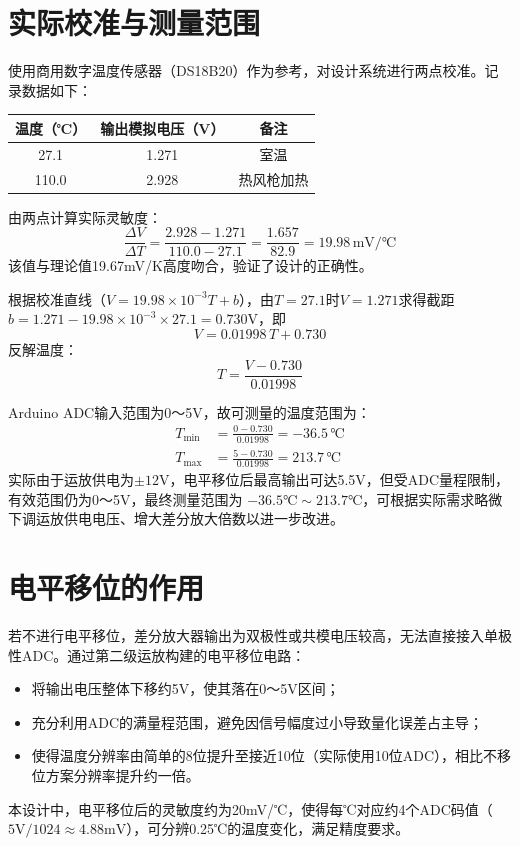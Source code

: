 \documentclass[12pt,a4paper]{article}
\begin{document}
\section{实际校准与测量范围}
使用商用数字温度传感器（DS18B20）作为参考，对设计系统进行两点校准。记录数据如下：
\begin{table}[H]
    \centering
    \begin{tabular}{c|c|c}
        \toprule
        温度（℃） & 输出模拟电压（V） & 备注 \\
        \midrule
        27.1 & 1.271 & 室温 \\
        110.0 & 2.928 & 热风枪加热 \\
        \bottomrule
    \end{tabular}
\end{table}

由两点计算实际灵敏度：
\begin{equation}
    \frac{\Delta V}{\Delta T} = \frac{2.928 - 1.271}{110.0 - 27.1} = \frac{1.657}{82.9} = 19.98\,\mathrm{mV/℃}
\end{equation}
该值与理论值19.67mV/K高度吻合，验证了设计的正确性。

根据校准直线（$V = 19.98\times 10^{-3} T + b$），由$T=27.1$时$V=1.271$求得截距$b = 1.271 - 19.98\times10^{-3}\times27.1 = 0.730\mathrm{V}$，即
\begin{equation}
    V = 0.01998\,T + 0.730
\end{equation}
反解温度：
\begin{equation}
    T = \frac{V - 0.730}{0.01998}
\end{equation}

Arduino ADC输入范围为0～5V，故可测量的温度范围为：
\begin{align}
    T_{\min} &= \frac{0 - 0.730}{0.01998} = -36.5\,℃ \\
    T_{\max} &= \frac{5 - 0.730}{0.01998} = 213.7\,℃
\end{align}
实际由于运放供电为$\pm12\mathrm{V}$，电平移位后最高输出可达5.5V，但受ADC量程限制，有效范围仍为0～5V，最终测量范围为 $-36.5℃ \sim 213.7℃$，可根据实际需求略微下调运放供电电压、增大差分放大倍数以进一步改进。

\section{电平移位的作用}
若不进行电平移位，差分放大器输出为双极性或共模电压较高，无法直接接入单极性ADC。通过第二级运放构建的电平移位电路：
\begin{itemize}
    \item 将输出电压整体下移约5V，使其落在0～5V区间；
    \item 充分利用ADC的满量程范围，避免因信号幅度过小导致量化误差占主导；
    \item 使得温度分辨率由简单的8位提升至接近10位（实际使用10位ADC），相比不移位方案分辨率提升约一倍。
\end{itemize}
本设计中，电平移位后的灵敏度约为20mV/℃，使得每℃对应约4个ADC码值（$5\mathrm{V}/1024 \approx 4.88\mathrm{mV}$），可分辨0.25℃的温度变化，满足精度要求。
\end{document}
